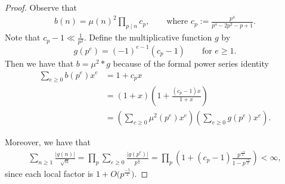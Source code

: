 \documentclass[12pt,letterpaper,reqno]{amsart}
\theoremstyle{plain}
\theoremstyle{definition}
\numberwithin{equation}{section}
\numberwithin{figure}{section}
\numberwithin{table}{section}
\begin{document}
\begin{proof}
    Observe that
    \begin{align*} b(n)=\mu(n)^2\prod_{p\mid n}c_p,\qquad \text{where } c_p:=\frac{p^4}{p^4-2p^2-p+1}.
    \end{align*}
    Note that $c_p-1\ll\frac{1}{p^2}$. 
    Define the multiplicative function $g$ by
    \[
        g(p^e)=(-1)^{e-1}(c_p-1)
        \qquad \text{for } e\ge1.
    \]
    Then we have that $b = \mu^2 * g$ 
    because of the formal power series identity
    \begin{align*}
        \sum_{e\ge0}b(p^e)x^e
        &=
        1+c_px \\
        &=
        (1+x)
        \left(
            1+\frac{(c_p-1)x}{1+x}
        \right) \\
        &=
        \left(\sum_{e\ge0}\mu^2(p^e)x^e\right)
        \left(\sum_{e\ge0}g(p^e)x^e\right).
    \end{align*}

    Moreover, we have that
    \begin{align} \label{eq:h(n)-convergence}
        \sum_{n\ge1}\frac{|g(n)|}{\sqrt{n}}
        =
        \prod_p
        \sum_{e\ge0} \frac{|g(p^e)|}{p^{\frac{e}{2}}}
        =\prod_p\left(1+(c_p-1)\frac{p^{\frac{-1}{2}}}{1-p^{\frac{-1}{2}}}\right)
        < \infty,
    \end{align}
    since each local factor is $1+O\big(p^{\frac{-5}{2}}\big)$.


\end{proof}
\end{document}
